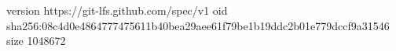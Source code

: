 version https://git-lfs.github.com/spec/v1
oid sha256:08c4d0e4864777475611b40bea29aee61f79be1b19ddc2b01e779dccf9a31546
size 1048672
